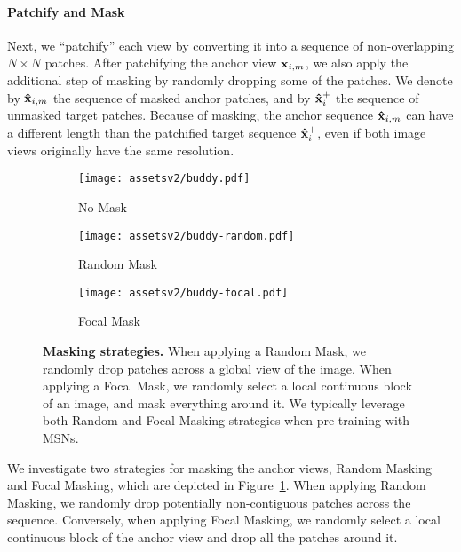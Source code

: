 \documentclass{article}
\begin{document}
\paragraph{Patchify and Mask}
Next, we ``patchify'' each view by converting it into a sequence of non-overlapping $N \times N$ patches. After patchifying the anchor view ${\bf x}_{i,m}$, we also apply the additional step of masking by randomly dropping some of the patches. We denote by ${\bf \hat{x}}_{i,m}$ the sequence of masked anchor patches, and by ${\bf \hat{x}}^+_i$ the sequence of unmasked target patches. Because of masking, the anchor sequence ${\bf\hat{x}}_{i,m}$ can have a different length than the patchified target sequence ${\bf\hat{x}}^+_i$, even if both image views originally have the same resolution.
\begin{figure}[t]
    \centering
    \begin{subfigure}{0.225\linewidth}
        \centering
        \texttt{[image: assetsv2/buddy.pdf]}
        \caption{\scriptsize No Mask}
    \end{subfigure}
    \begin{subfigure}{0.225\linewidth}
        \centering
        \texttt{[image: assetsv2/buddy-random.pdf]}
        \caption{\scriptsize Random Mask}
    \end{subfigure}
    \begin{subfigure}{0.225\linewidth}
        \centering
        \texttt{[image: assetsv2/buddy-focal.pdf]}
        \caption{\scriptsize Focal Mask}
    \end{subfigure}
    \caption{{\bf Masking strategies.} When applying a Random Mask, we randomly drop patches across a global view of the image. When applying a Focal Mask, we randomly select a local continuous block of an image, and mask everything around it. We typically leverage both Random and Focal Masking strategies when pre-training with MSNs.}
    \label{fig:masking_strategies}
\end{figure}

We investigate two strategies for masking the anchor views, Random Masking and Focal Masking, which are depicted in Figure~\ref{fig:masking_strategies}.
When applying Random Masking, we randomly drop potentially non-contiguous patches across the sequence. 
Conversely, when applying Focal Masking, we randomly select a local continuous block of the anchor view and drop all the patches around it.
\end{document}
